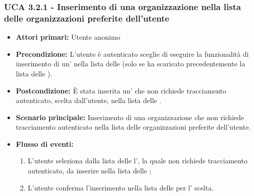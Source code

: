 \subsubsection{UCA 3.2.1 - Inserimento di una organizzazione nella lista delle organizzazioni preferite dell'utente}%
\begin{itemize}
	\item \textbf{Attori primari:} Utente anonimo
	\item \textbf{Precondizione:} L'utente è autenticato sceglie di eseguire la funzionalità di inserimento di un' nella lista delle  (solo se ha scaricato precedentemente la lista delle ).
	\item \textbf{Postcondizione:} È stata inserita un' che non richiede tracciamento autenticato, scelta dall'utente, nella lista delle .
	\item \textbf{Scenario principale:} Inserimento di una organizzazione che non richiede tracciamento autenticato nella lista delle organizzazioni preferite dell'utente.
	\item \textbf{Flusso di eventi:}
	\begin{enumerate}
		\item L'utente seleziona dalla lista delle  l', la quale non richiede tracciamento autenticato, da inserire nella lista delle ;
		\item L'utente conferma l'inserimento nella lista delle  per l' scelta.
	\end{enumerate}
\end{itemize}

